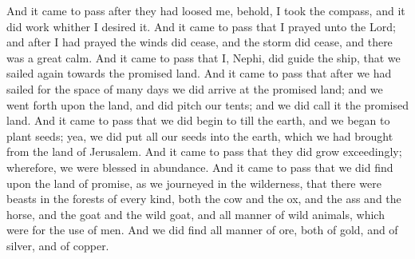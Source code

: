 And it came to pass after they had loosed me, behold, I took the compass, and it did work whither I desired it. And it came to pass that I prayed unto the Lord; and after I had prayed the winds did cease, and the storm did cease, and there was a great calm.
\bverse \iffalse And it came to pass that I, Nephi, did guide the ship, that we sailed again towards the promised land. \fi
And it came to pass that I, Nephi, did guide the ship, that we sailed again towards the promised land.
\bverse \iffalse And it came to pass that after we had sailed for the space of many days we did arrive at the promised land; and we went forth upon the land, and did pitch our tents; and we did call it the promised land. \fi
And it came to pass that after we had sailed for the space of many days we did arrive at the promised land; and we went forth upon the land, and did pitch our tents; and we did call it the promised land.
\bverse \iffalse And it came to pass that we did begin to till the earth, and we began to plant seeds; yea, we did put all our seeds into the earth, which we had brought from the land of Jerusalem. And it came to pass that they did grow exceedingly; wherefore, we were blessed in abundance. \fi
And it came to pass that we did begin to till the earth, and we began to plant seeds; yea, we did put all our seeds into the earth, which we had brought from the land of Jerusalem. And it came to pass that they did grow exceedingly; wherefore, we were blessed in abundance.
\bverse \iffalse And it came to pass that we did find upon the land of promise, as we journeyed in the wilderness, that there were beasts in the forests of every kind, both the cow and the ox, and the ass and the horse, and the goat and the wild goat, and all manner of wild animals, which were for the use of men. And we did find all manner of ore, both of gold, and of silver, and of copper. \fi
And it came to pass that we did find upon the land of promise, as we journeyed in the wilderness, that there were beasts in the forests of every kind, both the cow and the ox, and the ass and the horse, and the goat and the wild goat, and all manner of wild animals, which were for the use of men. And we did find all manner of ore, both of gold, and of silver, and of copper.

